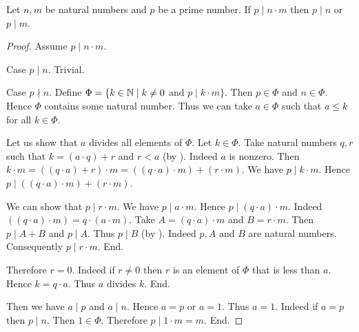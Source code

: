 \documentclass[10pt]{article}
\begin{document}
  \begin{forthel}
    \begin{proposition}
      Let $n, m$ be natural numbers and $p$ be a prime number.
      If $p \mid n \cdot m$ then $p \mid n$ or $p \mid m$.
    \end{proposition}
    \begin{proof}
      Assume $p \mid n \cdot m$.

      Case $p \mid n$. Trivial.

      Case $p \nmid n$.
        Define $\Phi = \{ k \in \mathbb{N} \mid k \neq 0$ and $p \mid k \cdot m \}$.
        Then $p \in \Phi$ and $n \in \Phi$.
        Hence $\Phi$ contains some natural number.
        Thus we can take $a \in \Phi$ such that $a \leq k$ for all $k \in \Phi$.

        Let us show that $a$ divides all elements of $\Phi$.
          Let $k \in \Phi$.
          Take natural numbers $q, r$ such that $k = (a \cdot q) + r$ and $r < a$ (by ).
          Indeed $a$ is nonzero.
          Then $k \cdot m
            = ((q \cdot a) + r) \cdot m
            = ((q \cdot a) \cdot m) + (r \cdot m)$.
          We have $p \mid k \cdot m$.
          Hence $p \mid ((q \cdot a) \cdot m) + (r \cdot m)$.

          We can show that $p \mid r \cdot m$.
            We have $p \mid a \cdot m$.
            Hence $p \mid (q \cdot a) \cdot m$.
            Indeed $((q \cdot a) \cdot m) = q \cdot (a \cdot m)$. %
            Take $A = (q \cdot a) \cdot m$ and $B = r \cdot m$. %
            Then $p \mid A + B$ and $p \mid A$.
            Thus $p \mid B$ (by ).
            Indeed $p, A$ and $B$ are natural numbers.
            Consequently $p \mid r \cdot m$.
          End.

          Therefore $r = 0$.
          Indeed if $r \neq 0$ then $r$ is an element of $\Phi$ that is less than $a$.
          Hence $k = q \cdot a$.
          Thus $a$ divides $k$.
        End.

        Then we have $a \mid p$ and $a \mid n$.
        Hence $a = p$ or $a = 1$.
        Thus $a = 1$.
        Indeed if $a = p$ then $p \mid n$.
        Then $1 \in \Phi$.
        Therefore $p \mid 1 \cdot m = m$.
      End.
    \end{proof}
  \end{forthel}
\end{document}
